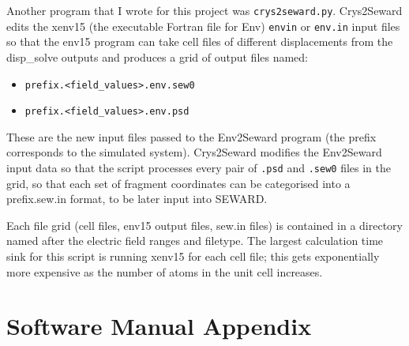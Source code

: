 \documentclass[10pt]{article}
\begin{document}
Another program that I wrote for this project was \texttt{crys2seward.py}. Crys2Seward edits the xenv15 (the executable Fortran file for Env) \texttt{envin} or \texttt{env.in} input files so that the env15 program can take cell files of different displacements from the disp\_solve outputs and produces a grid of output files named: 

\begin{itemize}
	\item \texttt{prefix.<field\_values>.env.sew0}
	\item \texttt{prefix.<field\_values>.env.psd}
\end{itemize}

These are the new input files passed to the Env2Seward program (the prefix corresponds to the simulated system). Crys2Seward modifies the Env2Seward input data so that the script processes every pair of \texttt{.psd} and \texttt{.sew0} files in the grid, so that each set of fragment coordinates can be categorised into a prefix.sew.in format, to be later input into SEWARD.

Each file grid (cell files, env15 output files, sew.in files) is contained in a directory named after the electric field ranges and filetype. The largest calculation time sink for this script is running xenv15 for each cell file; this gets exponentially more expensive as the number of atoms in the unit cell increases.

\newpage
\section*{Software Manual Appendix}




\end{document}
